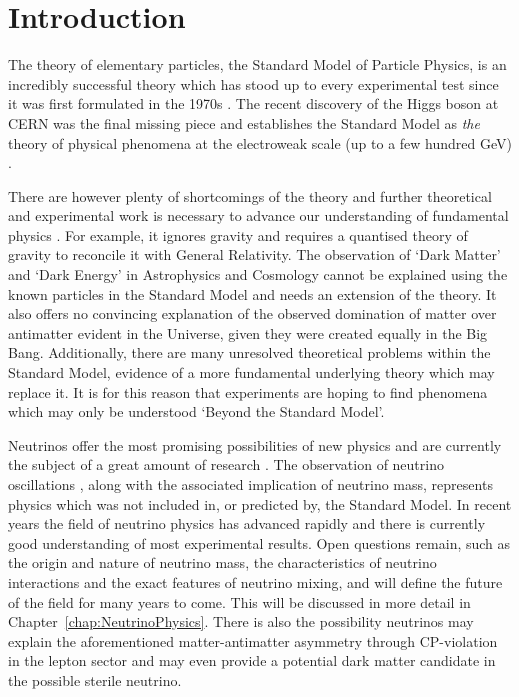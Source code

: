 
\graphicspath{{Introduction/Figs/}}

\chapter{Introduction}\label{chap:Introduction}

The theory of elementary particles, the Standard Model of Particle Physics, is an incredibly successful theory which has stood up to every experimental test since it was first formulated in the 1970s \cite{Glashow1961,Weinberg1967}.  The recent discovery of the Higgs boson at CERN \cite{Aad2012,Chatrchyan2012} was the final missing piece and establishes the Standard Model as \textit{the} theory of physical phenomena at the electroweak scale (up to a few hundred GeV) \cite{Shears2012,Bilenky2015}.

There are however plenty of shortcomings of the theory and further theoretical and experimental work is necessary to advance our understanding of fundamental physics \cite{Ellis2012}.  For example, it ignores gravity and requires a quantised theory of gravity to reconcile it with General Relativity.  The observation of `Dark Matter' and `Dark Energy' in Astrophysics and Cosmology cannot be explained using the known particles in the Standard Model and needs an extension of the theory.  It also offers no convincing explanation of the observed domination of matter over antimatter evident in the Universe, given they were created equally in the Big Bang.  Additionally, there are many unresolved theoretical problems within the Standard Model, evidence of a more fundamental underlying theory which may replace it.  It is for this reason that experiments are hoping to find phenomena which may only be understood `Beyond the Standard Model'.

Neutrinos offer the most promising possibilities of new physics and are currently the subject of a great amount of research \cite{Bilenky2015}.  The observation of neutrino oscillations \cite{SuperKamiokande1998,SNO2002}, along with the associated implication of neutrino mass, represents physics which was not included in, or predicted by, the Standard Model.  In recent years the field of neutrino physics has advanced rapidly and there is currently good understanding of most experimental results.  Open questions remain, such as the origin and nature of neutrino mass, the characteristics of neutrino interactions and the exact features of neutrino mixing, and will define the future of the field for many years to come.  This will be discussed in more detail in Chapter~\ref{chap:NeutrinoPhysics}.  There is also the possibility neutrinos may explain the aforementioned matter-antimatter asymmetry through CP-violation in the lepton sector and may even provide a potential dark matter candidate in the possible sterile neutrino.

